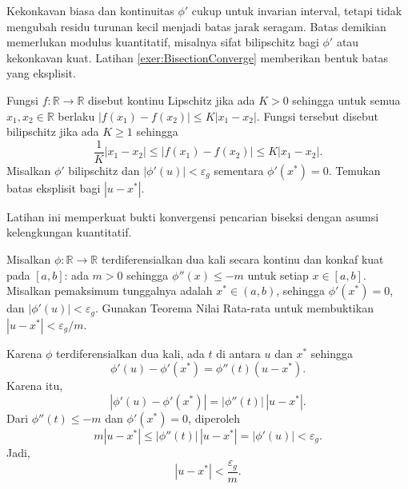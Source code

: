\begin{remark} Kekonkavan biasa dan kontinuitas $\phi'$ cukup untuk invarian interval, tetapi tidak mengubah residu turunan kecil menjadi batas jarak seragam. Batas demikian memerlukan modulus kuantitatif, misalnya sifat bilipschitz bagi $\phi'$ atau kekonkavan kuat. Latihan \ref{exer:BisectionConverge} memberikan bentuk batas yang eksplisit.
\end{remark}

\begin{exercise} Fungsi $f:\mathbb{R}\rightarrow\mathbb{R}$ disebut kontinu Lipschitz jika ada $K>0$ sehingga untuk semua $x_1,x_2\in\mathbb{R}$ berlaku $|f(x_1)-f(x_2)|\leq K|x_1-x_2|$. Fungsi tersebut disebut bilipschitz jika ada $K\geq1$ sehingga
\begin{equation}
\frac{1}{K}|x_1-x_2|\leq|f(x_1)-f(x_2)|\leq K|x_1-x_2|.
\end{equation}
Misalkan $\phi'$ bilipschitz dan $|\phi'(u)|<\varepsilon_g$ sementara $\phi'(x^*)=0$. Temukan batas eksplisit bagi $|u-x^*|$.
\end{exercise}

\begin{exercise}
Latihan ini memperkuat bukti konvergensi pencarian biseksi dengan asumsi kelengkungan kuantitatif.

Misalkan $\phi:\mathbb{R}\rightarrow\mathbb{R}$ terdiferensialkan dua kali secara kontinu dan konkaf kuat pada $[a,b]$: ada $m>0$ sehingga $\phi''(x)\leq-m$ untuk setiap $x\in[a,b]$. Misalkan pemaksimum tunggalnya adalah $x^*\in(a,b)$, sehingga $\phi'(x^*)=0$, dan $|\phi'(u)|<\varepsilon_g$. Gunakan Teorema Nilai Rata-rata untuk membuktikan $|u-x^*|<\varepsilon_g/m$.
\label{exer:BisectionConverge}
\end{exercise}

\begin{remark} Karena $\phi$ terdiferensialkan dua kali, ada $t$ di antara $u$ dan $x^*$ sehingga
\begin{equation}
\phi'(u)-\phi'(x^*)=\phi''(t)(u-x^*).
\end{equation}
Karena itu,
\begin{equation}
\left\lvert\phi'(u)-\phi'(x^*)\right\rvert=|\phi''(t)|\,|u-x^*|.
\end{equation}
Dari $\phi''(t)\leq-m$ dan $\phi'(x^*)=0$, diperoleh
\begin{equation}
m|u-x^*|\leq|\phi''(t)|\,|u-x^*|=|\phi'(u)|<\varepsilon_g.
\end{equation}
Jadi,
\begin{equation}
|u-x^*|<\frac{\varepsilon_g}{m}.
\end{equation}
\end{remark}

